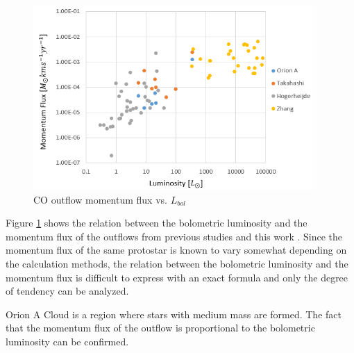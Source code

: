 \begin{figure}[b!]
	\centering
	\includegraphics[width=0.95\textwidth]{Luminosity}
	\caption{CO outflow momentum flux vs. $L_{bol}$}
	\label{fig:lum}
\end{figure}

Figure \ref{fig:lum} shows the relation between the bolometric luminosity and the momentum flux of the outflows from previous studies and this work \cite{takahashi2008millimeter, van2013outflow, hogerheijde1998envelope, nakamura2012evidence, aso2000dense, zhang2005search}.
Since the momentum flux of the same protostar is known to vary somewhat depending on the calculation methods\cite{van2013outflow}, the relation between the bolometric luminosity and the momentum flux is difficult to express with an exact formula and only the degree of tendency can be analyzed.

Orion A Cloud is a region where stars with medium mass are formed. The fact that the momentum flux of the outflow is proportional to the bolometric luminosity can be confirmed.	




